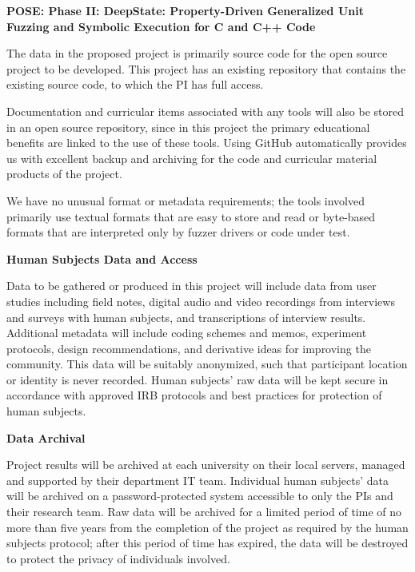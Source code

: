 \documentclass[12pt]{article}
\begin{document}

\begin{center}
  {\Large\sf\textbf{POSE: Phase II: DeepState: Property-Driven Generalized Unit Fuzzing and Symbolic Execution for C and C++ Code}}
\end{center}

The data in the proposed project is primarily source code for the open
source project to be developed.  This project has an existing
repository that contains the existing source code, to which the PI has
full access.

Documentation and curricular items associated with any tools will also be stored in
an open source repository, since in this project the primary
educational benefits are linked to the use of these tools.  Using GitHub automatically provides us with excellent backup
and archiving for the code and curricular material products of the
project.

We have no unusual format or metadata requirements; the
tools involved primarily use textual formats that are easy to store
and read or byte-based formats that are interpreted only by fuzzer
drivers or code under test.

\textbf{Human Subjects Data and Access}

Data to be gathered or produced in this project will include data from user studies including field notes, digital audio and video 
recordings from interviews and surveys with human subjects, and transcriptions of interview results. Additional metadata will include 
coding schemes and memos, experiment protocols, design recommendations, and derivative ideas for improving the community. This data 
will be suitably anonymized, such that participant location or identity is never recorded. Human subjects' raw data will be kept secure 
in accordance with approved IRB protocols and best practices for protection of human subjects.

\textbf{Data Archival}

Project results will be archived at each university on their local servers, managed and supported by their department IT team. Individual 
human subjects’ data will be archived on a password-protected system accessible to only the PIs and their research team. Raw data will 
be archived for a limited period of time of no more than five years from the completion of the project as required by the human subjects 
protocol; after this period of time has expired, the data will be destroyed to protect the privacy of individuals involved.
\end{document}
